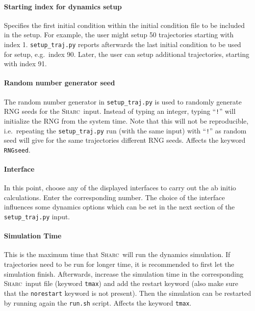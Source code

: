 \documentclass[a4paper,11pt,DIV=15,openany,twoside=false]{scrbook}
\newcommand{\sharc}{\textsc{Sharc}}
\newcommand{\ttt}[1]{\texttt{#1}}
\begin{document}
\paragraph{Starting index for dynamics setup}

Specifies the first initial condition within the initial condition file to be included in the setup. For example, the user might setup 50 trajectories starting with index 1. \ttt{setup\_traj.py} reports afterwards the last initial condition to be used for setup, e.g.\ index 90. Later, the user can setup additional trajectories, starting with index 91.

\paragraph{Random number generator seed}

The random number generator in \ttt{setup\_traj.py} is used to randomly generate RNG seeds for the \sharc\ input. Instead of typing an integer, typing ``\ttt{!}'' will initialize the RNG from the system time. Note that this will not be reproducible, i.e.\ repeating the \ttt{setup\_traj.py} run (with the same input) with ``\ttt{!}'' as random seed will give for the same trajectories different RNG seeds. Affects the keyword \ttt{RNGseed}.

\paragraph{Interface}

In this point, choose any of the displayed interfaces to carry out the ab initio calculations. Enter the corresponding number. The choice of the interface influences some dynamics options which can be set in the next section of the \ttt{setup\_traj.py} input.

\paragraph{Simulation Time}

This is the maximum time that \sharc\ will run the dynamics simulation. If trajectories need to be run for longer time, it is recommended to first let the simulation finish. Afterwards, increase the simulation time in the corresponding \sharc\ input file (keyword \ttt{tmax}) and add the restart keyword (also make sure that the \ttt{norestart} keyword is not present). Then the simulation can be restarted by running again the \ttt{run.sh} script. Affects the keyword \ttt{tmax}.
\end{document}
